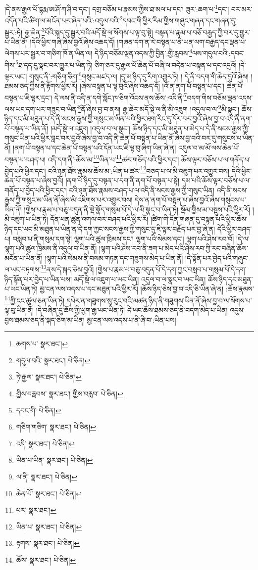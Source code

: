 །དེ་ནས་རྒྱལ་པོ་དྷརྨ་ཨ་ཤོ་ཀ་ཤི་བ་དང་། དགྲ་བཅོམ་པ་རྣམས་ཀྱིས་ཐ་མལ་པ་དང་། ཟུར་:ཆག་པ་\footnote{ཆགས་པ་  སྣར་ཐང་། }དང་། བར་མར་འདོན་པའི་ཚིག་ལ་མངོན་པར་ཞེན་པའི་:འདུལ་བའི་\footnote{གདུལ་བའི་  སྣར་ཐང་།  པེ་ཅིན། }དབང་གི་ཕྱིར་རིམ་གྱིས་གཞུང་གཞན་དང་གཞན་དུ་སྦྱར་:ཏེ། རྒྱ་ཆེན་\footnote{ཏེ།རྒྱལ་  སྣར་ཐང་།  པེ་ཅིན། }པོའི་སྐད་དུ་སྦྱར་བའི་མདོ་སྡེ་ལ་སོགས་པ་ལྟ་བུ་སྟེ། བསྟན་པ་རྣམ་པ་བཅོ་བརྒྱད་ཀྱི་བར་དུ་གྱུར་པ་ཡིན་ནོ། །དེའི་ཕྱིར་གཞི་ཞེས་བྱའོ་ཞེས་འཆད་དོ། །གཞན་དག་ན་རེ་བསྟན་པ་ནི་ཡན་ལག་བརྒྱད་དང་ལྡན་པ་ལེགས་པར་སྦྱར་བ་གཅིག་ཁོ་ན་ཡིན་ལ། དེ་ཉིད་བཅོམ་ལྡན་འདས་ཀྱི་བྱིན་:གྱི་རླབས་\footnote{གྱིས་བརླབས་  སྣར་ཐང་། གྱིས་བརླབ་  པེ་ཅིན། }ལས་གདུལ་བའི་:དབང་གིས་\footnote{དབང་གི་  པེ་ཅིན། }ཐ་དད་དུ་སྣང་བར་གྱུར་པ་ཡིན་ཏེ། ཅིག་ཅར་དུ་རྒྱལ་པོ་ཆེན་པོ་བཞི་ལ་བདེན་པ་བསྟན་པ་དང་འདྲའོ། །དེ་ལྟར་ཡང་། གསུང་ནི་:གཅིག་ཅིག་\footnote{གཅིག་གཅིག་  སྣར་ཐང་།  པེ་ཅིན། }གསུང་མཛད་ལ། །དུ་མ་ཉིད་དུ་རིག་འགྱུར་ཏེ། །
དེ་ནི་བདག་གི་ཆེད་དུའོ་ཞེས། །ཐམས་ཅད་ཀྱིས་ནི་རྟོགས་ཕྱིར་རོ། །ཞེས་བསྟན་པ་ལྟ་བུའོ་ཞེས་འཆད་དོ། །འོ་ན་ནག་པོ་བསྟན་པ་དང་། ཆེན་པོ་བསྟན་པ་ཇི་ལྟར་དྲང་། དེ་ལས་ནི་འདི་ན་དགེ་སློང་ཁ་ཅིག་འོངས་ནས་ཆོས་:འདི་ནི་\footnote{འདི་  སྣར་ཐང་།  པེ་ཅིན། }བདག་གིས་བཅོམ་ལྡན་འདས་ལས་ཡང་དག་པར་གཟུང་བ་ཡིན་\footnote{ཡིན་པ་ཡིན་  སྣར་ཐང་།  པེ་ཅིན། }ནོ་ཞེས་བྱ་བ་ནས། རྒྱ་ཆེར་མདོ་སྡེ་ལ་ནི་མི་འཇུག །འདུལ་བ་ལ་\footnote{ལ་ནི་  སྣར་ཐང་།  པེ་ཅིན། }མི་སྣང་། ཆོས་ཉིད་དང་མི་མཐུན་པ་དེ་ནི་སངས་རྒྱས་ཀྱི་གསུང་མ་ཡིན་པའི་ཕྱིར་ཐག་རིང་དུ་དོར་བར་བྱའོ་ཞེས་བྱ་བ་འདི་ནི་ནག་པོ་བསྟན་པ་ཡིན་ནོ། །མདོ་སྡེ་ལ་འཇུག །འདུལ་བ་ལ་སྣང་། ཆོས་ཉིད་དང་མི་མཐུན་པ་མེད་པ་དེ་ནི་སངས་རྒྱས་ཀྱི་གསུང་ཡིན་པའི་ཕྱིར་བླང་བར་བྱའོ་ཞེས་བྱ་བ་འདི་ནི་ཆེན་པོ་བསྟན་པ་ཡིན་ནོ་ཞེས་བྱ་བའི་བར་དུ་གསུངས་པ་ཡིན་ནོ། །ནག་པོ་བསྟན་པ་དང་ཆེན་པོ་བསྟན་པའི་དོན་ཡང་ཇི་ལྟ་བུ་ཞིག་ཡིན་ཞེ་ན། འདུལ་བ་མ་མོ་ལས་ཆེན་པོ་བསྟན་པ་བཤད་པ། འདི་དག་ནི་:ཆོས་མ་\footnote{ཆེན་པོ་  སྣར་ཐང་།  པེ་ཅིན། }ཡིན་པ་\footnote{པར་  སྣར་ཐང་། }ཚར་གཅོད་པའི་ཕྱིར་དང་། ཆོས་ལྟར་བཅོས་པ་ལ་གནོད་པ་བྱེད་པའི་ཕྱིར་དང་། ངའི་ཉན་ཐོས་རྣམས་ཆོས་མ་:ཡིན་པ་ཚར་\footnote{ཡིན་པ་  སྣར་ཐང་།  པེ་ཅིན། }བཅད་པ་ལ་མི་འཇུག་པར་འགྱུར་བས། དེའི་ཕྱིར་ཆེན་པོ་བསྟན་པ་ཞེས་བྱའོ། །ནག་པོ་ཉིད་དུ་བསྟན་པ་དག་ནི་ནག་པོ་བསྟན་པ་སྟེ། དམ་པའི་ཆོས་ལྟར་བཅོས་པ་ལ་གནོད་པ་བྱེད་པའི་ཕྱིར་དང་། ངའི་ཉན་ཐོས་རྣམས་བཤད་པ་ལ་འདི་ནི་སངས་རྒྱས་ཀྱི་གསུང་ཡིན། འདི་ནི་སངས་རྒྱས་ཀྱི་གསུང་མ་ཡིན་ནོ་ཞེས་མི་འཇིགས་པར་འགྱུར་བས། དེས་ན་ནག་པོ་བསྟན་པ་ཞེས་བྱའོ་ཞེས་གསུངས་པ་ཡིན་ནོ། །གྱེས་པ་རྣམ་པ་བཅུ་བདུན་ནི་སྡེ་སྣོད་གསུམ་པོ་དེ་ལ་མི་སྣང་བ་ཡིན་ཏེ། སྡོམ་གྱིས་མ་བསྡུས་པའི་ཕྱིར་རོ། །མི་འཇུག་པ་ཡིན་ཏེ། དོན་ཕན་ཚུན་འགལ་བར་བཤད་པའི་ཕྱིར་རོ། །ཚིག་གི་དོན་གཞན་དུ་བསྟན་པའི་ཕྱིར་ཆོས་ཉིད་དང་ཡང་མི་མཐུན་པ་ཡིན་ན་དེ་དག་ཀྱང་སངས་རྒྱས་ཀྱི་གསུང་དུ་ཇི་ལྟར་བརྗོད་པར་བྱ་ཞེ་ན། དེའི་ཕྱིར་བཤད་པ། བསླབ་པ་ནི་གསུམ་དག་སྟེ། ལྷག་པའི་ཚུལ་ཁྲིམས་དང་། ལྷག་པའི་སེམས་དང་། ལྷག་པའི་ཤེས་རབ་བོ། །དེ་ལ་ལྷག་པའི་ཚུལ་ཁྲིམས་ནི་འདུལ་བ་ཡིན་ནོ། །ལྷག་པའི་ཤེས་རབ་ནི་ཟག་པ་མེད་པའི་ཤེས་རབ་ཀྱི་རང་བཞིན་ཆོས་མངོན་པ་ཡིན་ནོ། །ལྷག་པའི་སེམས་ནི་བསམ་གཏན་དང་གཟུགས་མེད་པ་ཡིན་ནོ། །དེ་སྟོན་པར་བྱེད་པའི་གཞུང་ལ་ཡང་བཏགས་\footnote{རྟགས་  སྣར་ཐང་།  པེ་ཅིན། }ནས་དེ་སྐད་ཅེས་བྱའོ། །གྱེས་པ་རྣམ་པ་བཅུ་བདུན་པོ་དེ་དག་ཀྱང་བསླབ་པ་གསུམ་པོ་དེ་དག་ཉིད་སྟོན་པར་བྱེད་པ་ཡིན་པས། མདོ་སྡེ་ལ་འཇུག་པ་ཡང་ཡིན། འདུལ་བ་ལ་སྣང་བ་ཡང་ཡིན། ཆོས་ཉིད་དང་མཐུན་པ་ཡང་ཡིན་ཏེ། མྱ་ངན་ལས་འདས་པ་དང་མཐུན་པའི་ཕྱིར་རོ། །ཆོས་ཉིད་ཅེས་བྱ་བ་འདི་ཅི་ཡིན་ཞེ་ན། :ཆོས་རྣམས་\footnote{ཆོས་  སྣར་ཐང་།  པེ་ཅིན། }ཀྱི་ངང་ཚུལ་ཅན་ཡིན་ཏེ། དཔེར་ན་གཟུགས་སུ་རུང་བའི་མཚན་ཉིད་ནི་གཟུགས་ཡིན་ནོ་ཞེས་བྱ་བ་ལ་སོགས་པ་ལྟ་བུ་ཡིན་ནོ། །དེ་བཞིན་དུ་ཆོས་ཀྱི་ཕྱག་རྒྱ་ཡང་ཡིན་ཏེ། དེ་ཡང་ཆོས་ཐམས་ཅད་ནི་བདག་མེད་པ་ཡིན། འདུས་བྱས་ཐམས་ཅད་ནི་སྐད་ཅིག་མ་ཡིན། མྱ་ངན་ལས་འདས་པ་ནི་ཞི་བ་:ཡིན་པས། 